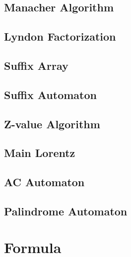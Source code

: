 \documentclass{article}
\newcommand{\makegrid}{
\clearpage

\begin{center}
    \begin{tikzpicture}
        \draw[step=1, gray, thin] (0,0) grid (20.0, 25.0);
    \end{tikzpicture}
\end{center}
}
\begin{document}
\subsection{Manacher Algorithm}


\subsection{Lyndon Factorization}


\subsection{Suffix Array}


\subsection{Suffix Automaton}


\subsection{Z-value Algorithm}


\subsection{Main Lorentz}


\subsection{AC Automaton}


\subsection{Palindrome Automaton}


\section{Formula}



\end{document}
